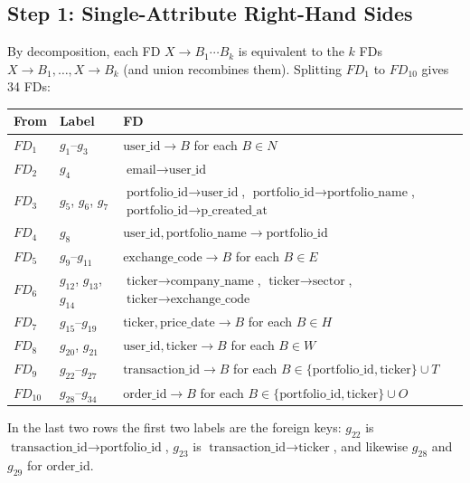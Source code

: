 \documentclass{article}
\newcommand{\at}[1]{\text{#1}}
\newcommand{\gr}[2]{g_{#1}\text{--}g_{#2}}
\begin{document}
\subsection*{Step 1: Single-Attribute Right-Hand Sides}

By decomposition, each FD $X \rightarrow B_1 \cdots B_k$ is equivalent to the $k$ FDs $X \rightarrow B_1, \dots, X \rightarrow B_k$ (and union recombines them). Splitting $FD_1$ to $FD_{10}$ gives 34 FDs:
\begin{center}
\begin{tabular}{l l l}
  \toprule
  \textbf{From} & \textbf{Label} & \textbf{FD} \\
  \midrule
  $FD_1$ & $\gr{1}{3}$ & $\at{user\_id} \rightarrow B$ for each $B \in N$ \\
  $FD_2$ & $g_4$ & $\at{email} \rightarrow \at{user\_id}$ \\
  $FD_3$ & $g_5$, $g_6$, $g_7$ & $\at{portfolio\_id} \rightarrow \at{user\_id}$, \quad $\at{portfolio\_id} \rightarrow \at{portfolio\_name}$, \quad $\at{portfolio\_id} \rightarrow \at{p\_created\_at}$ \\
  $FD_4$ & $g_8$ & $\at{user\_id}, \at{portfolio\_name} \rightarrow \at{portfolio\_id}$ \\
  $FD_5$ & $\gr{9}{11}$ & $\at{exchange\_code} \rightarrow B$ for each $B \in E$ \\
  $FD_6$ & $g_{12}$, $g_{13}$, $g_{14}$ & $\at{ticker} \rightarrow \at{company\_name}$, \quad $\at{ticker} \rightarrow \at{sector}$, \quad $\at{ticker} \rightarrow \at{exchange\_code}$ \\
  $FD_7$ & $\gr{15}{19}$ & $\at{ticker}, \at{price\_date} \rightarrow B$ for each $B \in H$ \\
  $FD_8$ & $g_{20}$, $g_{21}$ & $\at{user\_id}, \at{ticker} \rightarrow B$ for each $B \in W$ \\
  $FD_9$ & $\gr{22}{27}$ & $\at{transaction\_id} \rightarrow B$ for each $B \in \{\at{portfolio\_id}, \at{ticker}\} \cup T$ \\
  $FD_{10}$ & $\gr{28}{34}$ & $\at{order\_id} \rightarrow B$ for each $B \in \{\at{portfolio\_id}, \at{ticker}\} \cup O$ \\
  \bottomrule
\end{tabular}
\end{center}
In the last two rows the first two labels are the foreign keys: $g_{22}$ is $\at{transaction\_id} \rightarrow \at{portfolio\_id}$, $g_{23}$ is $\at{transaction\_id} \rightarrow \at{ticker}$, and likewise $g_{28}$ and $g_{29}$ for $\at{order\_id}$.
\end{document}
